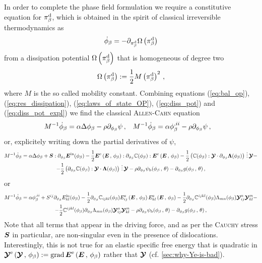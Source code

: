 \documentclass[preprint,review,3p,times,authoryear]{elsarticle}
\begin{document}
In order to complete the phase field formulation we require a constitutive equation for $\pi^{\text{d}}_{\beta}$, which is obtained in the spirit of classical irreversible thermodynamics as
\begin{equation}
  \label{eq:diss_pot}
  \sdot\phi_{\beta} = -\pder{\pdiss}{\pi^{\ud}_{\beta}}
\end{equation}
from a dissipation potential $\Omega\left(\pi^{\text{d}}_{\beta}\right)$ that is homogeneous of degree two
\begin{equation}
  \label{eq:diss_pot_expl}
  \Omega\left(\pi^{\text{d}}_{\beta}\right) := \frac{1}{2} M\left( \pi^{\text{d}}_{\beta} \right)^{2}\,,
\end{equation}
where $M$ is the so called mobility constant. Combining equations (\ref{eq:bal_op}), (\ref{eq:res_dissipation}), (\ref{eq:laws_of_state_OP}), (\ref{eq:diss_pot}) and (\ref{eq:diss_pot_expl}) we find the classical \textsc{Allen-Cahn} equation
\begin{align}
  \label{eq:AC_equation}
  &M^{-1}\sdot\phi_{\beta} = \alpha\Delta\phi_{\beta} - \rho\pder{\psi}{\phi_{\beta}}\,,
  && M^{-1}\sdot\phi_{\beta} = \alpha\phi_{\beta}^{,ii} - \rho\pder{\psi}{\phi_{\beta}}\,,
\end{align}
or, explicitely writing down the partial derivatives of $\psi$,
\begin{multline}
  \label{eq:AC_equation_explicit}
  M^{-1}\sdot\phi_{\beta} = \alpha\Delta\phi_{\beta} + \tS:\pder{\tEtr}{\phi_{\beta}} - \half\tEe:\pder{\bbC(\phi_{\beta})}{\phi_{\beta}}:\tEe - \half\left( \bbC(\phi_{\beta}):\ttY\cdot\pder{\tLcore}{\phi_{\beta}} \right)\tridot \ttY -\\-  \half\left( \pder{\bbC(\phi_{\beta})}{\phi_{\beta}}:\ttY\cdot\tLcore \right) \tridot \ttY - \rho\pder{\psi_{\ub}(\phi_{\beta}\,,\,\theta)}{\phi_{\beta}} - \pder{g(\phi_{\beta}\,,\,\theta)}{\phi_{\beta}}\,,
\end{multline}
or
\begin{multline*}
M^{-1}\sdot\phi_{\beta} = \alpha\phi_{\beta}^{,ii} + S^{ij}\pder{E^{\text{in}}_{kl}(\phi_{\beta})}{\phi_{\beta}} - \half\pder{\bbC_{ijkl}(\phi_{\beta})}{\phi_{\beta}}E^{\text{e}}_{ij}\left( \tE\,,\,\phi_{\beta} \right)E^{\text{e}}_{kl}\left( \tE\,,\,\phi_{\beta} \right) - \half \pder{\bbC^{ijkl}(\phi_{\beta})}{\phi_{\beta}}\Lambda_{mn}(\phi_{\beta}) \ttY_{ij}^{n}\ttY_{kl}^{m} -\\-  \half \bbC^{ijkl}(\phi_{\beta})\pder{\Lambda_{mn}(\phi_{\beta})}{\phi_{\beta}} \ttY_{ij}^{n}\ttY_{kl}^{m} - \rho\pder{\psi_{\ub}(\phi_{\beta}\,,\,\theta)}{\phi_{\beta}} - \pder{g(\phi_{\beta}\,,\,\theta)}{\phi_{\beta}}\,,
\end{multline*}
%
Note that all terms that appear in the driving force, and as per \citet{Lazar:2005} the \textsc{Cauchy} stress $\boldsymbol{S}$ in particular, are non-singular even in the presence of dislocations. Interestingly, this is not true for an elastic specific free energy that is quadratic in $\boldsymbol{\mathcal{Y}}^{\text{e}}\left(\boldsymbol{\mathcal{Y}}\,,\,\phi_{\beta}\right):=\operatorname*{grad}\boldsymbol{E}^{\text{e}}\left(\boldsymbol{E}\,,\,\phi_{\beta}\right)$ rather that $\boldsymbol{\mathcal{Y}}$ (cf. \ref{sec:why-Ye-is-bad}).
\end{document}

